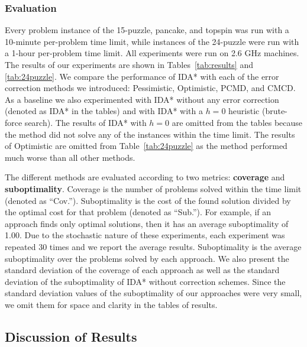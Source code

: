 \documentclass[letterpaper]{article}
\begin{document}
\subsubsection{Evaluation}

Every problem instance of the 15-puzzle, pancake, and topspin was run with a 10-minute per-problem time limit, while instances of the 24-puzzle were run with a 1-hour per-problem time limit. All experiments were run
on 2.6 GHz machines. %
The results of our experiments are shown in Tables~\ref{tab:results} and \ref{tab:24puzzle}.
We compare the performance of IDA* with each of the error correction methods we introduced: Pessimistic, Optimistic, PCMD, and CMCD. As a baseline we also experimented with IDA* without any error correction (denoted as IDA* in the tables) and with IDA* with a $h=0$ heuristic (brute-force search). The results of IDA* with $h=0$ are omitted from the tables because
the method
did not solve any of the instances within the time limit. The results of Optimistic are omitted from Table~\ref{tab:24puzzle} as the method performed much worse than all other methods.

The different methods are evaluated according to two metrics: \textbf{coverage} and \textbf{suboptimality}. Coverage is the number of problems solved within the time limit (denoted as ``Cov.'').
Suboptimality is the cost of the found solution divided by the optimal cost for that problem (denoted as ``Sub.''). For example, if an approach finds only optimal solutions, then it has an average suboptimality of 1.00.
Due to the stochastic nature of these experiments, each experiment was repeated 30 times and we report the average results. Suboptimality is the average suboptimality over the problems solved by each approach. We also present the standard deviation of the coverage of each approach as well as the standard deviation of the suboptimality of IDA* without correction schemes. Since the standard deviation values of the suboptimality of our approaches were very small, we omit them for space and clarity in the tables of results.









\subsection{Discussion of Results}
\end{document}
